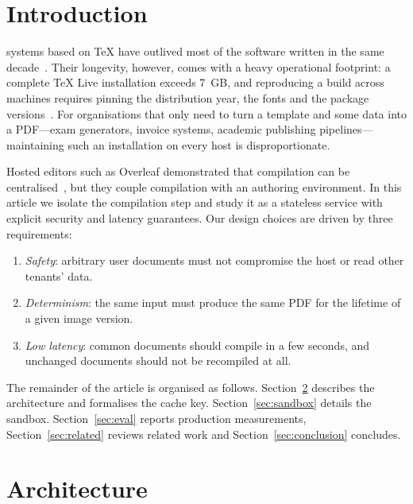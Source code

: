 \documentclass[journal]{IEEEtran}
\begin{document}
\IEEEpeerreviewmaketitle

\section{Introduction}
 systems based on \TeX{} have outlived most of
the software written in the same decade~\cite{knuth1986texbook}. Their
longevity, however, comes with a heavy operational footprint: a complete
\TeX{} Live installation exceeds 7~GB, and reproducing a build across
machines requires pinning the distribution year, the fonts and the
package versions~\cite{lamport1994latex}. For organisations that only need
to turn a template and some data into a PDF---exam generators, invoice
systems, academic publishing pipelines---maintaining such an installation on
every host is disproportionate.

Hosted editors such as Overleaf demonstrated that compilation can be
centralised~\cite{overleaf2023}, but they couple compilation with an
authoring environment. In this article we isolate the compilation step and
study it as a stateless service with explicit security and latency
guarantees. Our design choices are driven by three requirements:

\begin{enumerate}
  \item \emph{Safety}: arbitrary user documents must not compromise the
    host or read other tenants' data.
  \item \emph{Determinism}: the same input must produce the same PDF for the
    lifetime of a given image version.
  \item \emph{Low latency}: common documents should compile in a few seconds,
    and unchanged documents should not be recompiled at all.
\end{enumerate}

The remainder of the article is organised as follows. Section~\ref{sec:design}
describes the architecture and formalises the cache key.
Section~\ref{sec:sandbox} details the sandbox. Section~\ref{sec:eval} reports
production measurements, Section~\ref{sec:related} reviews related work and
Section~\ref{sec:conclusion} concludes.

\section{Architecture}
\label{sec:design}
\end{document}
